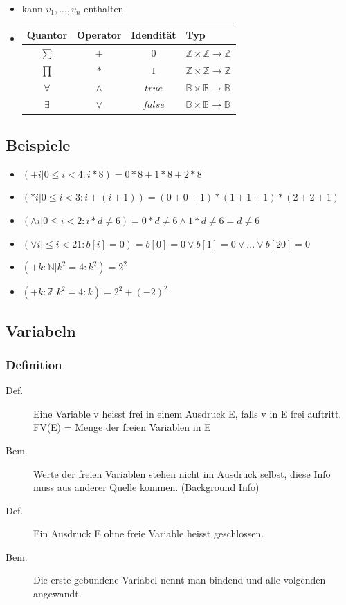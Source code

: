 \documentclass[a4paper,10pt]{article}
\newcommand{\BN}{\mathbb{B}} %
\newcommand{\NN}{\mathbb{N}} %
\newcommand{\ZN}{\mathbb{Z}} %
\newcommand{\ra}{\rightarrow}
\begin{document}
\begin{description}
\begin{itemize}
		\item kann $v_1, ..., v_n$ enthalten
		\item \begin{tabular}{ c c c l }
				  Quantor & Operator & Idendit\"at & Typ \\
				  \hline 
				  $\sum$ & $+$ & $0$ & $\ZN \times \ZN \ra \ZN$  \\
				  $\prod$ & $*$ & $1$ & $\ZN \times \ZN \ra \ZN$  \\
				  $\forall$ & $\wedge$ & $true$ & $\BN \times \BN \ra \BN$  \\
				  $\exists$ & $\vee$ & $false$ & $\BN \times \BN \ra \BN$ \\
			\end{tabular}
	\end{itemize}
\end{description}

\subsection{Beispiele}
\begin{itemize} 
	\item $(+ i | 0 \leq i < 4:i*8) = 0*8 + 1*8 + 2 *8$
	\item $(* i | 0 \leq i < 3:i+(i+1)) =(0 + 0 + 1) * (1 + 1 + 1) * (2 + 2 + 1)$
	\item $(\wedge i | 0 \leq i < 2:i*d \neq 6) = 0*d \neq 6 \wedge 1*d \neq 6 = d \neq 6$  
	\item $(\vee i| \leq i < 21:b[i]=0) = b[0] = 0 \vee b[1] = 0 \vee ... \vee b[20] = 0$
	\item $(+k:\NN | k^2=4:k^2)=2^2$
	\item $(+k:\ZN | k^2=4:k)=2^2 + (-2)^2$
\end{itemize}

\subsection{Variabeln}

\subsubsection{Definition}

\begin{description}
	\item[Def.] Eine Variable v heisst frei in einem Ausdruck E, falls v in E frei auftritt. \\
		FV(E) = Menge der freien Variablen in E
	\item[Bem.] Werte der freien Variablen stehen nicht im Ausdruck selbst, diese Info muss aus anderer Quelle kommen. (Background Info)
	\item[Def.] Ein Ausdruck E ohne freie Variable heisst geschlossen.
	\item[Bem.] Die erste gebundene Variabel nennt man bindend und alle volgenden angewandt.
\end{description}
\end{document}
